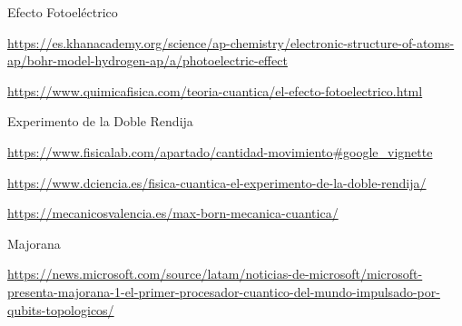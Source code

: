 \documentclass{article}
\begin{document}
        Efecto Fotoeléctrico\par
        \url{https://es.khanacademy.org/science/ap-chemistry/electronic-structure-of-atoms-ap/bohr-model-hydrogen-ap/a/photoelectric-effect}
        \vspace{2mm}

        \url{https://www.quimicafisica.com/teoria-cuantica/el-efecto-fotoelectrico.html}
        \vspace{2mm}

        Experimento de la Doble Rendija\par
        \url{https://www.fisicalab.com/apartado/cantidad-movimiento#google_vignette}
        \vspace{2mm}

        \url{https://www.dciencia.es/fisica-cuantica-el-experimento-de-la-doble-rendija/}
        \vspace{2mm}

        \url{https://mecanicosvalencia.es/max-born-mecanica-cuantica/}
        \vspace{2mm}

        Majorana\par
        \url{https://news.microsoft.com/source/latam/noticias-de-microsoft/microsoft-presenta-majorana-1-el-primer-procesador-cuantico-del-mundo-impulsado-por-qubits-topologicos/}
        \vspace{2mm}
    
\end{document}
